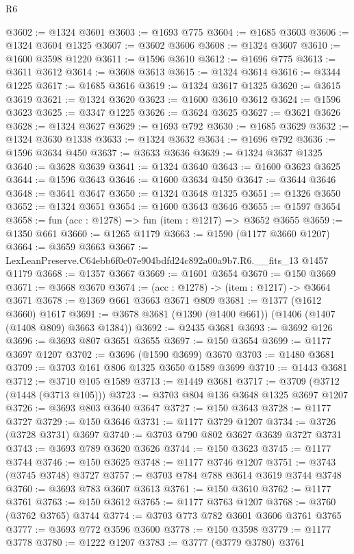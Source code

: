 \begin{lexlean}{R6}
\begin{coremodule}
@3602 := @1324 @3601
@3603 := @1693 @775
@3604 := @1685 @3603
@3606 := @1324 @3604 @1325
@3607 := @3602 @3606
@3608 := @1324 @3607
@3610 := @1600 @3598 @1220
@3611 := @1596 @3610
@3612 := @1696 @775
@3613 := @3611 @3612
@3614 := @3608 @3613
@3615 := @1324 @3614
@3616 := @3344 @1225
@3617 := @1685 @3616
@3619 := @1324 @3617 @1325
@3620 := @3615 @3619
@3621 := @1324 @3620
@3623 := @1600 @3610 @3612
@3624 := @1596 @3623
@3625 := @3347 @1225
@3626 := @3624 @3625
@3627 := @3621 @3626
@3628 := @1324 @3627
@3629 := @1693 @792
@3630 := @1685 @3629
@3632 := @1324 @3630 @1338
@3633 := @1324 @3632
@3634 := @1696 @792
@3636 := @1596 @3634 @450
@3637 := @3633 @3636
@3639 := @1324 @3637 @1325
@3640 := @3628 @3639
@3641 := @1324 @3640
@3643 := @1600 @3623 @3625
@3644 := @1596 @3643
@3646 := @1600 @3634 @450
@3647 := @3644 @3646
@3648 := @3641 @3647
@3650 := @1324 @3648 @1325
@3651 := @1326 @3650
@3652 := @1324 @3651
@3654 := @1600 @3643 @3646
@3655 := @1597 @3654
@3658 := fun (acc : @1278) => fun (item : @1217) => @3652 @3655
@3659 := @1350 @661
@3660 := @1265 @1179
@3663 := @1590 (@1177 @3660 @1207)
@3664 := @3659 @3663
@3667 := LexLeanPreserve.C64ebb6f0c07e904bdfd24c892a00a9b7.R6.__fits_13 @1457 @1179
@3668 := @1357 @3667
@3669 := @1601 @3654
@3670 := @150 @3669
@3671 := @3668 @3670
@3674 := (acc : @1278) -> (item : @1217) -> @3664 @3671
@3678 := @1369 @661 @3663 @3671 @809
@3681 := @1377 (@1612 @3660) @1617
@3691 := @3678 @3681 (@1390 (@1400 @661)) (@1406 (@1407 (@1408 @809) @3663 @1384))
@3692 := @2435 @3681
@3693 := @3692 @126
@3696 := @3693 @807 @3651 @3655
@3697 := @150 @3654
@3699 := @1177 @3697 @1207
@3702 := @3696 (@1590 @3699) @3670
@3703 := @1480 @3681
@3709 := @3703 @161 @806 @1325 @3650 @1589 @3699
@3710 := @1443 @3681
@3712 := @3710 @105 @1589
@3713 := @1449 @3681
@3717 := @3709 (@3712 (@1448 (@3713 @105)))
@3723 := @3703 @804 @136 @3648 @1325 @3697 @1207
@3726 := @3693 @803 @3640 @3647
@3727 := @150 @3643
@3728 := @1177 @3727
@3729 := @150 @3646
@3731 := @1177 @3729 @1207
@3734 := @3726 (@3728 @3731) @3697
@3740 := @3703 @790 @802 @3627 @3639 @3727 @3731
@3743 := @3693 @789 @3620 @3626
@3744 := @150 @3623
@3745 := @1177 @3744
@3746 := @150 @3625
@3748 := @1177 @3746 @1207
@3751 := @3743 (@3745 @3748) @3727
@3757 := @3703 @784 @788 @3614 @3619 @3744 @3748
@3760 := @3693 @783 @3607 @3613
@3761 := @150 @3610
@3762 := @1177 @3761
@3763 := @150 @3612
@3765 := @1177 @3763 @1207
@3768 := @3760 (@3762 @3765) @3744
@3774 := @3703 @773 @782 @3601 @3606 @3761 @3765
@3777 := @3693 @772 @3596 @3600
@3778 := @150 @3598
@3779 := @1177 @3778
@3780 := @1222 @1207
@3783 := @3777 (@3779 @3780) @3761

\end{coremodule}
\end{lexlean}
